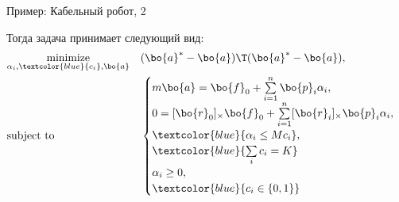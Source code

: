 \documentclass{beamer}
\begin{document}
	
	
	\begin{frame}{Пример: Кабельный робот, 2}
		\begin{flushleft}
			
			Тогда задача принимает следующий вид:
			\begin{equation}
				\begin{aligned}
					& \underset{\alpha_i, \textcolor{blue}{c_i} , \bo{a}}{\text{minimize}}
					& & (\bo{a}^* - \bo{a})\T (\bo{a}^* - \bo{a}), 
					\\
					& \text{subject to}
					& & \begin{cases}
						m \bo{a} = \bo{f}_0 + \sum\limits_{i = 1}^{n} \bo{p}_i \alpha_i,
						\\
						0 = [\bo{r}_0]_\times \bo{f}_0 + \sum\limits_{i = 1}^{n} [\bo{r}_i]_\times \bo{p}_i \alpha_i,
						\\
						\textcolor{blue}{\alpha_i \leq M c_i},
						\\
						\textcolor{blue}{\sum\limits_i c_i = K}
						\\
						\alpha_i \geq 0,
						\\
						\textcolor{blue}{c_i \in \{0, 1\}}
					\end{cases}
				\end{aligned}
			\end{equation}
			
			
		\end{flushleft}
	\end{frame}
	
	
	
	
	\myqrframe
	
\end{document}

